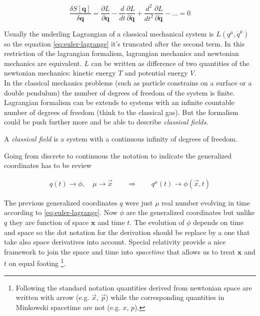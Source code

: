 \begin{equation} \label{eq:euler-lagrange}
  \frac{\delta S[\bm{q}]}{\delta \bm{q}} =
  \frac{\partial L}{\partial \bm{q}} -
  \frac{d}{dt}\frac{\partial L}{\partial \dot{\bm{q}}} +
  \frac{d^2}{dt^2}\frac{\partial L}{\partial \ddot{\bm{q}}} -
  \ldots = 0
\end{equation}

Usually the underling Lagrangian of a classical mechanical system is $L(q^{\mu},
\dot{q}^{\mu})$ so the equation \eqref{eq:euler-lagrange} it's truncated after
the second term. In this restriction of the lagrangian formalism, lagrangian
mechanics and newtonian mechanics are equivalent. $L$ can be written as
difference of two quantities of the newtonian mechanics: kinetic energy $T$ and
potential energy $V$. \\

In the classical mechanics problems (such as particle constrains on a surface or
a double pendulum) the number of degrees of freedom of the system is finite.
Lagrangian formalism can be extends to systems with an infinite countable number
of degrees of freedom (think to the classical gas). But the formalism could be
push further more and be able to describe \emph{classical fields}.

\begin{definition}\label{def: classical field}
  \cite{Aldrovandi19_classical_field}
  A \emph{classical field} is a system with a continuous infinity of degrees of
  freedom.
\end{definition}

Going from discrete to continuous the notation to indicate the generalized
coordinates has to be review

\begin{align*}
  q(t) \rightarrow \phi, \quad \mu \rightarrow \vec{x}
  \qquad \Rightarrow \qquad
  q^{\mu}(t) \rightarrow \phi(\vec{x},t)
\end{align*}

The previous generalized coordinates $q$ were just $\mu$ real number evolving in
time according to \eqref{eq:euler-lagrange}. Now $\phi$ are the generalized
coordinates but unlike $q$ they are function of space $\bm{x}$ and time $t$. The
evolution of $\phi$ depends on time and space so the dot notation for the
derivation should be replace by a one that take also space derivatives
into account. Special relativity provide a nice framework to join the space and
time into \emph{spacetime} that allows us to treat $\bm{x}$ and $t$ on equal
footing
\footnote{
  Following the standard notation quantities derived from newtonian space are
  written with arrow (e.g. $\vec{x}$, $\vec{p}$) while the corresponding quantities
  in Minkowski spacetime are not (e.g. $x$, $p$).
}.

